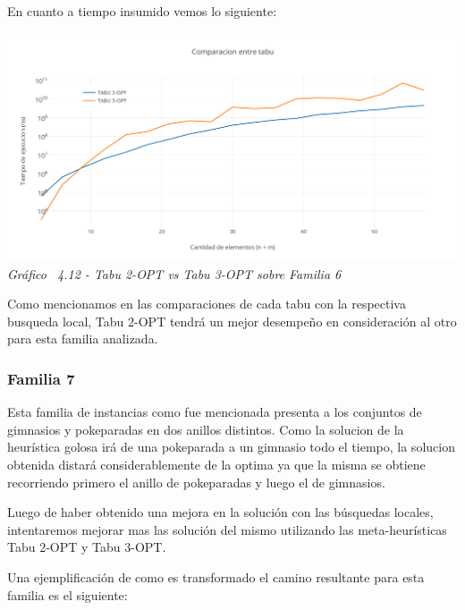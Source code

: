 En cuanto a tiempo insumido vemos lo siguiente:

\vspace*{0.3cm} \vspace*{0.3cm}
  \begin{center}
 \includegraphics[scale=0.5]{./EJ4/comparacionsinorden1.png}\\
 {            \textit{Gráfico \ 4.12 - Tabu 2-OPT vs Tabu 3-OPT sobre Familia 6}}
  \end{center}
  \vspace*{0.3cm}
  
Como mencionamos en las comparaciones de cada tabu con la respectiva busqueda local, Tabu 2-OPT tendr\'a un mejor desempeño en consideraci\'on al otro para esta familia analizada.

\subsubsection*{Familia 7}

Esta familia de instancias como fue mencionada presenta a los conjuntos de gimnasios y pokeparadas en dos anillos distintos.
Como la solucion de la heur\'istica golosa ir\'a  de una pokeparada a un gimnasio todo el tiempo, la solucion obtenida distar\'a considerablemente de la optima ya que la misma se obtiene recorriendo primero el anillo de pokeparadas y luego el de gimnasios.

Luego de haber obtenido una mejora en la soluci\'on con las b\'usquedas locales, intentaremos mejorar mas las soluci\'on del mismo utilizando las meta-heur\'isticas Tabu 2-OPT y Tabu 3-OPT.

Una ejemplificaci\'on de como es transformado el camino resultante para esta familia es el siguiente:\\

